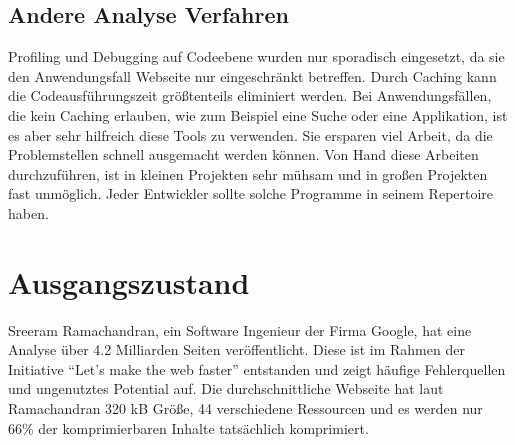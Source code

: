 \subsection{Andere Analyse Verfahren}
Profiling und Debugging auf Codeebene wurden nur sporadisch eingesetzt, da sie den Anwendungsfall Webseite nur eingeschränkt betreffen. Durch Caching kann die Codeausführungszeit größtenteils eliminiert werden. Bei Anwendungsfällen, die kein Caching erlauben, wie zum Beispiel eine Suche oder eine Applikation, ist es aber sehr hilfreich diese Tools zu verwenden. Sie ersparen viel Arbeit, da die Problemstellen schnell ausgemacht werden können. Von Hand diese Arbeiten durchzuführen, ist in kleinen Projekten sehr mühsam und in großen Projekten fast unmöglich. Jeder Entwickler sollte solche Programme in seinem Repertoire haben.
\section{Ausgangszustand}  
Sreeram Ramachandran, ein Software Ingenieur der Firma Google, hat eine Analyse über 4.2 Milliarden Seiten veröffentlicht. Diese ist im Rahmen der Initiative "`Let's make the web faster"' entstanden und zeigt häufige Fehlerquellen und ungenutztes Potential auf. Die durchschnittliche Webseite hat laut Ramachandran 320 kB Größe, 44 verschiedene Ressourcen und es werden nur 66\% der komprimierbaren Inhalte tatsächlich komprimiert.  %
